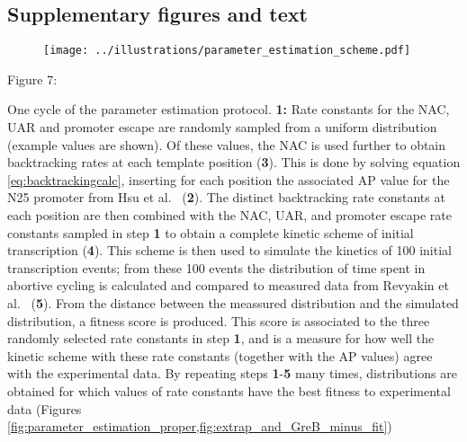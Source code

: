 \subsection{Supplementary figures and text}

\begin{figure}
    \begin{center}
      \texttt{[image: ../illustrations/parameter\_estimation\_scheme.pdf]}
    \end{center}
    \caption{}
    \label{fig:parameter_estimation_scheme}
\end{figure}

Figure 7:

One cycle of the parameter estimation protocol. \textbf{1:} Rate constants for
the NAC, UAR and promoter escape are randomly sampled from a uniform
distribution (example values are shown). Of these values, the NAC is used
further to obtain backtracking rates at each template position (\textbf{3}).
This is done by solving equation \eqref{eq:backtrackingcalc}, inserting for
each position the associated AP value for the N25 promoter from Hsu et al.\
\cite{hsu_initial_2006} (\textbf{2}). The distinct backtracking rate constants
at each position are then combined with the NAC, UAR, and promoter escape rate
constants sampled in step \textbf{1} to obtain a complete kinetic scheme of
initial transcription (\textbf{4}). This scheme is then used to simulate the
kinetics of 100 initial transcription events; from these 100 events the
distribution of time spent in abortive cycling is calculated and compared to
measured data from Revyakin et al.\ \cite{revyakin_abortive_2006}
(\textbf{5}). From the distance between the meassured distribution and the
simulated distribution, a fitness score is produced. This score is associated
to the three randomly selected rate constants in step \textbf{1}, and is a
measure for how well the kinetic scheme with these rate constants (together
with the AP values) agree with the experimental data. By repeating steps
\textbf{1}-\textbf{5} many times, distributions are obtained for which values
of rate constants have the best fitness to experimental data (Figures
\ref{fig:parameter_estimation_proper,fig:extrap_and_GreB_minus_fit}) 
